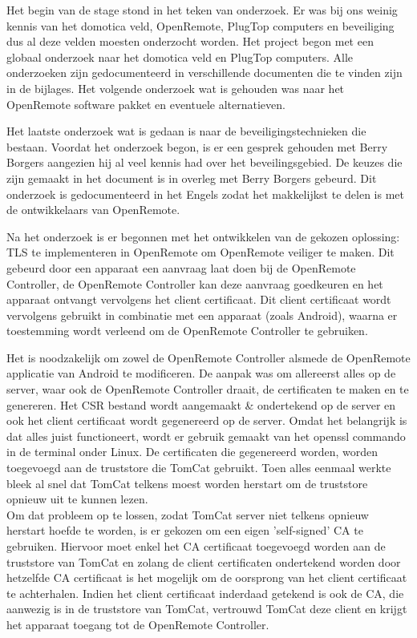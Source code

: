 \documentclass[]{article}
\begin{document}
Het begin van de stage stond in het teken van onderzoek. Er was bij ons
weinig kennis van het domotica veld, OpenRemote, PlugTop computers en
beveiliging dus al deze velden moesten onderzocht worden. Het project begon
met een globaal onderzoek naar het domotica veld en PlugTop computers. Alle
onderzoeken zijn gedocumenteerd in verschillende documenten die te vinden
zijn in de bijlages. Het volgende onderzoek wat is gehouden was naar het
OpenRemote software pakket en eventuele alternatieven.

Het laatste onderzoek wat is gedaan is naar de beveiligingstechnieken die
bestaan. Voordat het onderzoek begon, is er een gesprek gehouden met Berry
Borgers aangezien hij al veel kennis had over het beveilingsgebied. De
keuzes die zijn gemaakt in het document is in overleg met Berry Borgers
gebeurd. Dit onderzoek is gedocumenteerd in het Engels zodat het
makkelijkst te delen is met de ontwikkelaars van OpenRemote.

Na het onderzoek is er begonnen met het ontwikkelen van de gekozen oplossing:
TLS te implementeren in OpenRemote om OpenRemote veiliger te maken. Dit gebeurd
door een apparaat een aanvraag laat doen bij de OpenRemote Controller, de
OpenRemote Controller kan deze aanvraag goedkeuren en het apparaat ontvangt
vervolgens het client certificaat. Dit client certificaat wordt vervolgens
gebruikt in combinatie met een apparaat (zoals Android), waarna er toestemming
wordt verleend om de OpenRemote Controller te gebruiken.

Het is noodzakelijk om zowel de OpenRemote Controller alsmede de OpenRemote
applicatie van Android te modificeren. De aanpak was om allereerst alles op de
server, waar ook de OpenRemote Controller draait, de certificaten te maken en te
genereren. Het CSR bestand wordt aangemaakt \& ondertekend op de server en ook
het client certificaat wordt gegenereerd op de server. Omdat het belangrijk is
dat alles juist functioneert, wordt er gebruik gemaakt van het openssl commando
in de terminal onder Linux. De certificaten die gegenereerd worden, worden
toegevoegd aan de truststore die TomCat gebruikt. Toen alles eenmaal werkte
bleek al snel dat TomCat telkens moest worden herstart om de truststore opnieuw
uit te kunnen lezen.\\ Om dat probleem op te lossen, zodat TomCat server niet
telkens opnieuw herstart hoefde te worden, is er gekozen om een eigen
'self-signed' CA te gebruiken. Hiervoor moet enkel het CA certificaat toegevoegd
worden aan de truststore van TomCat en zolang de client certificaten ondertekend
worden door hetzelfde CA certificaat is het mogelijk om de oorsprong van het
client certificaat te achterhalen. Indien het client certificaat inderdaad
getekend is ook de CA, die aanwezig is in de truststore van TomCat, vertrouwd
TomCat deze client en krijgt het apparaat toegang tot de OpenRemote Controller.
\end{document}
